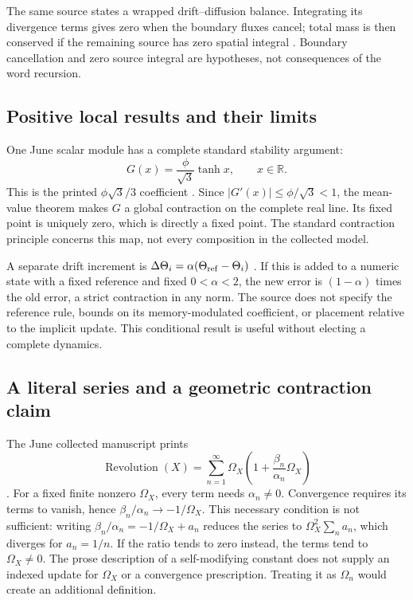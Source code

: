 \documentclass[11pt,a4paper]{article}
\theoremstyle{definition}
\newcommand{\R}{\mathbb R}
\newcommand{\phig}{\phi}
\numberwithin{equation}{section}
\begin{document}
The same source states a wrapped drift--diffusion balance. Integrating its
divergence terms gives zero when the boundary fluxes cancel; total mass is
then conserved if the remaining source has zero spatial integral
\cite[physical p.~17, Eq.~(24)]{P14}.
Boundary cancellation and zero source integral are hypotheses, not
consequences of the word recursion.

\subsection{Positive local results and their limits}

One June scalar module has a complete standard stability argument:
\begin{equation}
 G(x)=\frac{\phig}{\sqrt3}\tanh x,\qquad x\in\R.
 \label{eq:golden-tanh}
\end{equation}
This is the printed $\phig\sqrt3/3$ coefficient
\cite[physical p.~1, \S2.1]{P08}.
Since $|G'(x)|\leq\phig/\sqrt3<1$, the mean-value theorem makes
$G$ a global contraction on the complete real line. Its fixed point
is uniquely zero, which is directly a fixed point. The standard contraction
principle concerns this map, not every composition in the collected model.

A separate drift increment is
$\Delta\Theta_i=\alpha(\Theta_{\rm ref}-\Theta_i)$
\cite[physical p.~13, \S5.4]{P03}.
If this is added to a numeric state with a fixed reference and fixed
$0<\alpha<2$, the new error is $(1-\alpha)$ times the old error, a
strict contraction in any norm. The source does not specify the
reference rule, bounds on its memory-modulated coefficient, or placement
relative to the implicit update. This conditional result is useful
without electing a complete dynamics.

\subsection{A literal series and a geometric contraction claim}

The June collected manuscript prints
\begin{equation}
 \operatorname{Revolution}(X)=
 \sum_{n=1}^{\infty}\Omega_X
 \left(1+\frac{\beta_n}{\alpha_n}\Omega_X\right)
 \label{eq:revolution}
\end{equation}
\cite[physical pp.~4,6]{P13}.
For a fixed finite nonzero $\Omega_X$, every term needs $\alpha_n\ne0$.
Convergence requires its terms to vanish, hence
$\beta_n/\alpha_n\to-1/\Omega_X$. This necessary condition is not
sufficient: writing $\beta_n/\alpha_n=-1/\Omega_X+a_n$ reduces the series
to $\Omega_X^2\sum_n a_n$, which diverges for $a_n=1/n$.
If the ratio tends to zero instead, the terms tend to $\Omega_X\ne0$.
The prose description of a self-modifying constant does not supply an
indexed update for $\Omega_X$ or a convergence prescription. Treating it
as $\Omega_n$ would create an additional definition.
\end{document}
